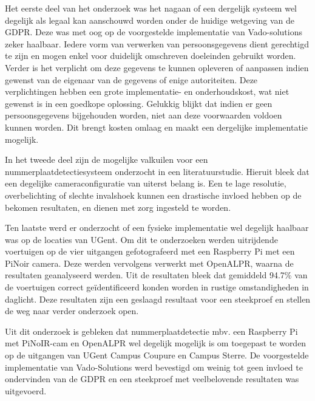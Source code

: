 Het eerste deel van het onderzoek was het nagaan of een dergelijk systeem wel degelijk als legaal kan aanschouwd worden onder de huidige wetgeving van de GDPR. Deze was met oog op de voorgestelde implementatie van Vado-solutions zeker haalbaar. Iedere vorm van verwerken van persoonsgegevens dient gerechtigd te zijn en mogen enkel voor duidelijk omschreven doeleinden gebruikt worden. Verder is het verplicht om deze gegevens te kunnen opleveren of aanpassen indien gewenst van de eigenaar van de gegevens of enige autoriteiten. Deze verplichtingen hebben een grote implementatie- en onderhoudskost, wat niet gewenst is in een goedkope oplossing. Gelukkig blijkt dat indien er geen persoonsgegevens bijgehouden worden, niet aan deze voorwaarden voldoen kunnen worden. Dit brengt kosten omlaag en maakt een dergelijke implementatie mogelijk.

In het tweede deel zijn de mogelijke valkuilen voor een nummerplaatdetectiesysteem onderzocht in een literatuurstudie. Hieruit bleek dat een degelijke cameraconfiguratie van uiterst belang is. Een te lage resolutie, overbelichting of slechte invalshoek kunnen een drastische invloed hebben op de bekomen resultaten, en dienen met zorg ingesteld te worden.

Ten laatste werd er onderzocht of een fysieke implementatie wel degelijk haalbaar was op de locaties van UGent. Om dit te onderzoeken werden uitrijdende voertuigen op de vier uitgangen gefotografeerd met een Raspberry Pi met een PiNoir camera. Deze werden vervolgens verwerkt met OpenALPR, waarna de resultaten geanalyseerd werden. Uit de resultaten bleek dat gemiddeld 94.7\% van de voertuigen correct geïdentificeerd konden worden in rustige omstandigheden in daglicht. Deze resultaten zijn een geslaagd resultaat voor een steekproef en stellen de weg naar verder onderzoek open.

Uit dit onderzoek is gebleken dat nummerplaatdetectie mbv. een Raspberry Pi met PiNoIR-cam en OpenALPR wel degelijk mogelijk is om toegepast te worden op de uitgangen van UGent Campus Coupure en Campus Sterre. De voorgestelde implementatie van Vado-Solutions werd bevestigd om weinig tot geen invloed te ondervinden van de GDPR en een steekproef met veelbelovende resultaten was uitgevoerd.
